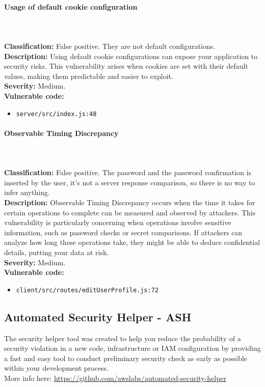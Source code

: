\documentclass[]{article}
\begin{document}
\paragraph{Usage of default cookie configuration} \mbox{} \\ \\
\textbf{Classification:} False positive. They are not default configurations.\\
\textbf{Description:} Using default cookie configurations can expose your application to security risks. This vulnerability arises when cookies are set with their default values, making them predictable and easier to exploit. \\ 
\textbf{Severity:} Medium. \\ 
\textbf{Vulnerable code:}
\begin{itemize}
    \item \texttt{server/src/index.js:48}
\end{itemize}

\paragraph{Observable Timing Discrepancy} \mbox{} \\ \\
\textbf{Classification:} False positive. The password and the password confirmation is inserted by the user, it's not a server response comparison, so there is no way to infer anything.\\
\textbf{Description:} Observable Timing Discrepancy occurs when the time it takes for certain operations to complete can be measured and observed by attackers. This vulnerability is particularly concerning when operations involve sensitive information, such as password checks or secret comparisons. If attackers can analyze how long these operations take, they might be able to deduce confidential details, putting your data at risk. \\ 
\textbf{Severity:} Medium. \\ 
\textbf{Vulnerable code:}
\begin{itemize}
    \item \texttt{client/src/routes/editUserProfile.js:72}
\end{itemize}

\subsection{Automated Security Helper - ASH}
The security helper tool was created to help you reduce the probability of a security violation in a new code, infrastructure or IAM configuration by providing a fast and easy tool to conduct preliminary security check as early as possible within your development process. \\
More info here: \footnotesize\url{https://github.com/awslabs/automated-security-helper}
\normalsize
\end{document}
